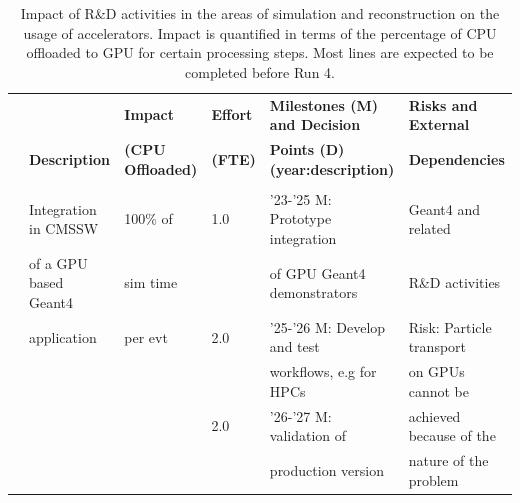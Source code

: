 \documentclass{cmspaper}
\newcommand{\trh}{\cellcolor{tablerowheader}}
\newcounter{magicrownumbers}
\newcommand\rownumber{\refstepcounter{magicrownumbers}\arabic{magicrownumbers}}
\newcommand{\B}[1]{\textbf{#1}}
\newcommand{\UP}[1]{\multirow{-2}{*}{\B{#1}}}
\begin{document}
\begin{table}[ht]
{\footnotesize
\begin{center}
\caption{Impact of R\&D activities in the areas of simulation and reconstruction on the usage of accelerators. Impact is quantified in terms of the percentage of CPU offloaded to GPU for certain processing steps. Most lines are expected to be completed before Run 4.}
\label{tab:gpu_sim_reco}
\begin{tabular}{llllll} 
\rowcolor{tableheader}&                  & \B{Impact}           & \B{Effort} & \B{Milestones (M) and Decision}  & \B{Risks and External} \\
\rowcolor{tableheader}& \UP{Description} & \B{(CPU Offloaded)}  & \B{(FTE)} & \B{Points (D) (year:description)} & \B{Dependencies}       \\
\hline\hline
\rowcolor{tableheader} \multicolumn{6}{c}{\textit{Simulation}} \\ \hline
\rownumber
\trh &\trh Integration in CMSSW        & 100\% of    & 1.0 & '23-'25 M: Prototype integration & Geant4 and related         \\
\trh &\trh of a GPU based Geant4       & sim time    &     &  of GPU Geant4 demonstrators     & R\&D activities            \\ 
\trh &\trh application                 & per evt     & 2.0 & '25-'26 M: Develop and test      & Risk: Particle transport   \\
\trh &\trh                             &             &     & workflows, e.g for HPCs          & on GPUs cannot be          \\ 
\trh &\trh                             &             & 2.0 & '26-'27 M: validation of         & achieved because of the    \\ 
\trh &\trh                             &             &     & production version               & nature of the problem      \\
\hline

\end{tabular}
\end{center}}
\end{table}
\end{document}
